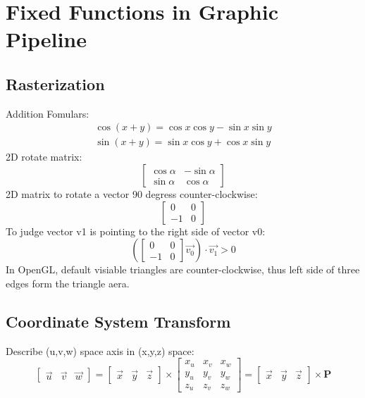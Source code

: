 \documentclass[12pt]{article}
\begin{document}
\section{Fixed Functions in Graphic Pipeline}
    \subsection{Rasterization}
        Addition Fomulars:
        \[ \begin{array}{c}
            \cos{ \left( x+y \right) }=\cos{x}\cos{y}-\sin{x}\sin{y} \\
            \sin{ \left( x+y \right) }=\sin{x}\cos{y}+\cos{x}\sin{y}
        \end{array} \]
        2D rotate matrix:
        \[ \left[ \begin{array}{rr}
            \cos{\alpha} & -\sin{\alpha} \\
            \sin{\alpha} & \cos{\alpha}
        \end{array} \right] \]
        2D matrix to rotate a vector 90 degress counter-clockwise:
        \[ \left[ \begin{array}{rr}
            0 & 0\\
            -1 & 0
        \end{array} \right] \]
        To judge vector v1 is pointing to the right side of vector v0:
        \[
        \left(
            \left[ \begin{array}{rr} 0 & 0\\ -1 & 0 \end{array} \right]
            \overrightarrow{v_0}
        \right)
        \cdot \overrightarrow{v_1} > 0
        \]
        In OpenGL, default visiable triangles are counter-clockwise, thus left side of 
        three edges form the triangle aera.
    \subsection{Coordinate System Transform}
        Describe (u,v,w) space axis in (x,y,z) space:
        \[
            \left[ \begin{array}{ccc} \overrightarrow{u} & \overrightarrow{v} & \overrightarrow{w} \end{array} \right]
            =
            \left[ \begin{array}{ccc} \overrightarrow{x} & \overrightarrow{y} & \overrightarrow{z} \end{array} \right]
            \times
            \left[ \begin{array}{ccc}
                x_u & x_v & x_w \\
                y_u & y_v & y_w \\
                z_u & z_v & z_w
            \end{array} \right]
            =
            \left[ \begin{array}{ccc} \overrightarrow{x} & \overrightarrow{y} & \overrightarrow{z} \end{array} \right]
            \times
            \textbf{P}
        \]
\end{document}
